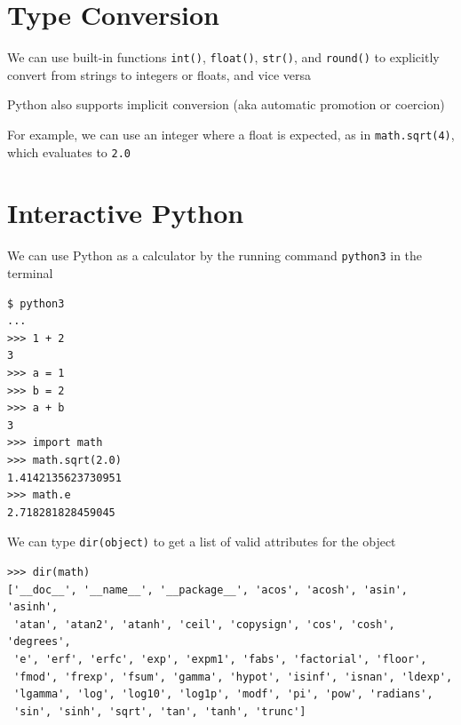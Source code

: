 \documentclass[8pt,a4paper,compress]{beamer}
\begin{document}
\section{Type Conversion}
\begin{frame}[fragile]
\pause

We can use built-in functions \lstinline{int()}, \lstinline{float()}, \lstinline{str()}, and \lstinline{round()} to explicitly convert from strings to integers or floats, and vice versa

\pause\bigskip

Python also supports implicit conversion (aka automatic promotion or coercion)

\pause\bigskip

For example, we can use an integer where a float is expected, as in \lstinline{math.sqrt(4)}, which evaluates to \lstinline{2.0}
\end{frame}

\section{Interactive Python}
\begin{frame}[fragile]
\pause

We can use Python as a calculator by the running command \lstinline{python3} in the terminal

\smallskip

\begin{lstlisting}[language={},style=focusin]
$ python3
...
>>> 1 + 2
3
>>> a = 1
>>> b = 2
>>> a + b
3
>>> import math
>>> math.sqrt(2.0)
1.4142135623730951
>>> math.e
2.718281828459045
\end{lstlisting}

\pause\bigskip

We can type \lstinline{dir(object)} to get a list of valid attributes for the object

\smallskip

\begin{lstlisting}[language={},style=focusin]
>>> dir(math)
['__doc__', '__name__', '__package__', 'acos', 'acosh', 'asin', 'asinh', 
 'atan', 'atan2', 'atanh', 'ceil', 'copysign', 'cos', 'cosh', 'degrees', 
 'e', 'erf', 'erfc', 'exp', 'expm1', 'fabs', 'factorial', 'floor', 
 'fmod', 'frexp', 'fsum', 'gamma', 'hypot', 'isinf', 'isnan', 'ldexp', 
 'lgamma', 'log', 'log10', 'log1p', 'modf', 'pi', 'pow', 'radians', 
 'sin', 'sinh', 'sqrt', 'tan', 'tanh', 'trunc']
\end{lstlisting}
\end{frame}
\end{document}
